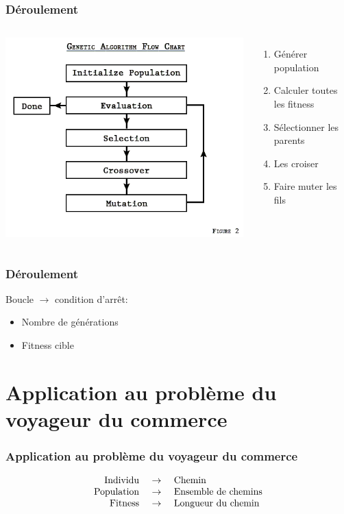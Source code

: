 \documentclass[16pt]{beamer}
\begin{document}
\begin{frame}
  \frametitle{Déroulement}
  \begin{columns}
        \centering
            \includegraphics[scale=0.4]{GA.png}
        \begin{enumerate}
            \item Générer population \pause{}
            \item Calculer toutes les fitness \pause{}
            \item Sélectionner les parents \pause{}
            \item Les croiser \pause{}
            \item Faire muter les fils
        \end{enumerate}
  \end{columns}
\end{frame}

\begin{frame}
  \frametitle{Déroulement}
  Boucle $\rightarrow$ condition d'arrêt:
  \begin{itemize}
    \item Nombre de générations
    \item Fitness cible 
  \end{itemize}
\end{frame}

\section{Application au problème du voyageur du commerce}
\begin{frame}
  \frametitle{Application au problème du voyageur du commerce}
  \begin{block}{}
\[
  \begin{array}{r c l}
    \text{Individu } &\rightarrow& \text{ Chemin} \\
    \text{Population } &\rightarrow& \text{ Ensemble de chemins} \\
    \text{Fitness } &\rightarrow& \text{ Longueur du chemin} 
   \end{array}{}
\]
\end{block}
\end{frame}
\end{document}

